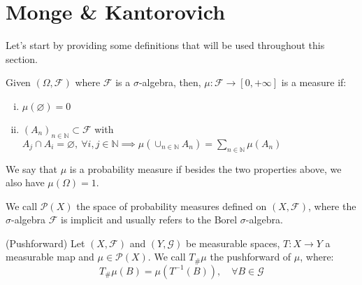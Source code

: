 \newpage
\chapter{Monge \& Kantorovich}

Let's start by providing some definitions that will be used throughout this section.
\begin{definition}
  Given $(\Omega,\mathcal F)$ where $\mathcal F$ is a $\sigma$-algebra,
  then, $\mu: \mathcal F \to [0,+\infty]$ is a measure if:
  \begin{enumerate}[i)]
    \item $\mu(\varnothing)=0$
    \item $(A_n)_{n\in \mathbb N} \subset \mathcal F$ with
          $A_j \cap A_i = \varnothing ,\ \forall i,j \in \mathbb N\implies
            \mu(\cup_{n \in \mathbb N}A_n) = \sum_{n \in \mathbb N}\mu(A_n)$
  \end{enumerate}
  We say that $\mu$ is a probability measure if besides the two
  properties above, we also have $\mu(\Omega) = 1$.
\end{definition}

\begin{definition}
  We call $\mathcal P(X)$ the space of probability measures defined
  on $(X,\mathcal F)$, where the $\sigma$-algebra $\mathcal F$
  is implicit and usually refers to the Borel $\sigma$-algebra.
\end{definition}

\begin{definition}(Pushforward)
  Let $(X,\mathcal F)$ and $(Y, \mathcal G)$ be measurable spaces, $T : X \to Y$ a measurable map
  and $\mu \in \mathcal P(X)$. We call $T_\# \mu$ the
  pushforward of $\mu$, where:
  \begin{equation}
    T_\#\mu(B) = \mu(T^{-1}(B)),\quad \forall B \in \mathcal G
  \end{equation}
\end{definition}


